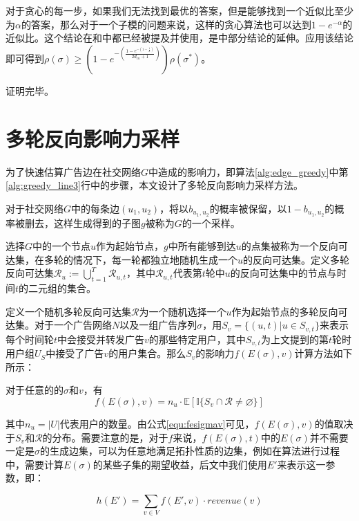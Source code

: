 对于贪心的每一步，如果我们无法找到最优的答案，但是能够找到一个近似比至少为$\alpha$的答案，那么对于一个子模的问题来说，这样的贪心算法也可以达到$1-e^{-\alpha}$的近似比。这个结论在\parencite{mrim}和\parencite{goundan2007revisiting}中都已经被提及并使用，是\parencite{nemhauser1978analysis}中部分结论的延伸。应用该结论即可得到$\rho(\sigma)\ge (1-e^{-(\frac{1-e^{-(1-\frac{1}{k})}}{2d_{in}+1})})\rho(\sigma^*)$。

\noindent 证明完毕。

\section{多轮反向影响力采样}
\label{sec:mrris}
为了快速估算广告边在社交网络$G$中造成的影响力，即算法\ref{alg:edge_greedy}中第\ref{alg:greedy_line3}行中的步骤，本文设计了多轮反向影响力采样方法。

对于社交网络$G$中的每条边$(u_1,u_2)$，将以$b_{u_1,u_2}$的概率被保留，以$1-b_{u_1,u_2}$的概率被删去，这样生成得到的子图$g$被称为$G$的一个采样。

选择$G$中的一个节点$u$作为起始节点，$g$中所有能够到达$u$的点集被称为一个反向可达集，在多轮的情况下，每一轮都独立地随机生成一个$u$的反向可达集。定义多轮反向可达集$\mathcal{R}_u := \bigcup_{t=1}^{T}\mathcal{R}_{u,t}$，其中$\mathcal{R}_{u,t}$代表第$t$轮中$u$的反向可达集中的节点与时间$t$的二元组的集合。

定义一个随机多轮反向可达集$\mathcal{R}$为一个随机选择一个$u$作为起始节点的多轮反向可达集。对于一个广告网络$N$以及一组广告序列$\sigma$，用$S_v =\{(u,t) | u\in S_{v,t}\}$来表示每个时间轮$t$中会接受并转发广告$v$的那些特定用户，其中$S_{v,t}$为上文提到的第$t$轮时用户组$U_S$中接受了广告$v$的用户集合。那么$S_v$的影响力$f(E(\sigma), v)$计算方法如下所示：

\begin{lemma}
对于任意的的$\sigma$和$v$，有
\begin{equation}
    \label{equ:fesigmav}
    f(E(\sigma), v)=n_u \cdot\mathbb{E}[\mathbb{I}\{S_v\cap\mathcal{R}\ne \varnothing \}]
\end{equation}
\end{lemma}
\noindent 其中$n_u=|U|$代表用户的数量。由公式\autoref{equ:fesigmav}可见，$f(E(\sigma),v)$的值取决于$S_v$和$\mathcal{R}$的分布。需要注意的是，对于$f$来说，$f(E(\sigma),t)$中的$E(\sigma)$并不需要一定是$\sigma$的生成边集，可以为任意地满足拓扑性质的边集，例如在算法进行过程中，需要计算$E(\sigma)$的某些子集的期望收益，后文中我们使用$E'$来表示这一参数，即：

\begin{equation}
    h(E')=\sum_{v \in V}f(E',v)\cdot revenue(v)
\end{equation}


